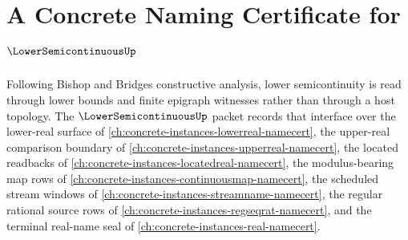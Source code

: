\chapter{A Concrete Naming Certificate for $\LowerSemicontinuousUp$}
\label{ch:concrete-instances-lowersemicontinuous-namecert}

Following Bishop and Bridges constructive analysis, lower semicontinuity is
read through lower bounds and finite epigraph witnesses rather than through a
host topology. The $\LowerSemicontinuousUp$ packet records that interface over
the lower-real surface of \autoref{ch:concrete-instances-lowerreal-namecert},
the upper-real comparison boundary of
\autoref{ch:concrete-instances-upperreal-namecert}, the located readbacks of
\autoref{ch:concrete-instances-locatedreal-namecert}, the modulus-bearing
map rows of \autoref{ch:concrete-instances-continuousmap-namecert}, the
scheduled stream windows of \autoref{ch:concrete-instances-streamname-namecert},
the regular rational source rows of
\autoref{ch:concrete-instances-regseqrat-namecert}, and the terminal real-name
seal of \autoref{ch:concrete-instances-real-namecert}.

